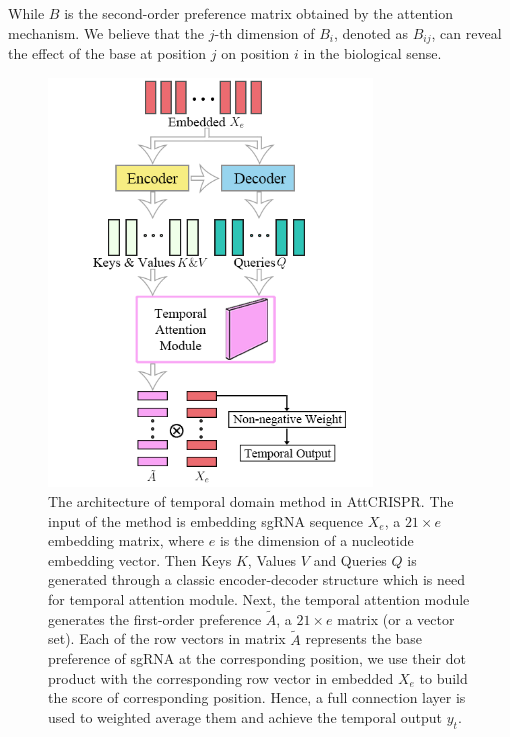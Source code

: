 \documentclass{bioinfo}
\begin{document}
While $B$ is the second-order preference matrix obtained by the attention mechanism. 
We believe that the $j$-th dimension of $B_i$, denoted as $B_{ij}$, can reveal the effect of the base at position $j$ on position $i$ in the biological sense. 
\begin{figure}[!tpb]%
    \centerline{\includegraphics[width=86mm]{temporalmodule.png}}
    \caption{The architecture of temporal domain method in AttCRISPR. 
    The input of the method is embedding sgRNA sequence $X_e$, a $21\times e$ embedding matrix, where $e$ is the dimension of a nucleotide embedding vector. 
    Then Keys $K$, Values $V$ and Queries $Q$ is generated through a classic encoder-decoder structure which is need for temporal attention module.
    Next, the temporal attention module generates the first-order preference $\tilde{A}$, a $21\times e$ matrix (or a vector set). 
    Each of the row vectors in matrix $\tilde{A}$ represents the base preference of sgRNA at the corresponding position, we use their dot product with the corresponding row vector in embedded $X_e$ to build the score of corresponding position. 
    Hence, a full connection layer is used to weighted average them and achieve the temporal output $y_t$.
    }\label{fig:04}
\end{figure}
\end{document}
